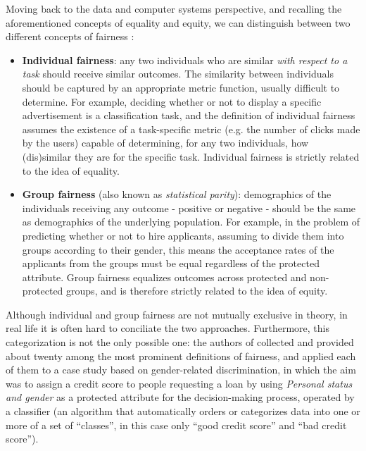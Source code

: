 Moving back to the data and computer systems perspective, and recalling the aforementioned concepts of equality and equity, we can distinguish between two different concepts of fairness \cite{dwork2012fairness}:
\begin{itemize}
\item \textbf{Individual fairness}: any two individuals who are similar \textit{with respect to a task} should receive similar outcomes. The similarity between individuals should be captured by an appropriate metric function, usually difficult to determine. For example, deciding whether or not to display a specific advertisement is a classification task, and the definition of individual fairness assumes the existence of a task-specific metric (e.g. the number of clicks made by the users) capable of determining, for any two individuals, how (dis)similar they are for the specific task. Individual fairness is strictly related to the idea of equality.
\item \textbf{Group fairness} (also known as \textit{statistical parity}): demographics of the individuals receiving any outcome - positive or negative - should be the same as demographics of the underlying population. For example, in the problem of predicting whether or not to hire applicants, assuming to divide them into groups according to their gender, this means the acceptance rates of the applicants from the groups must be equal regardless of the protected attribute. Group fairness equalizes outcomes across protected and non-protected groups, and is therefore strictly related to the idea of equity.
\end{itemize}

Although individual and group fairness are not mutually exclusive in theory, in real life it is often hard to conciliate the two approaches. Furthermore, this categorization is not the only possible one: the authors of \cite{verma2018fairness} collected and provided about twenty among the most prominent definitions of fairness, and applied each of them to a case study based on gender-related discrimination, in which the aim was to assign a credit score to people requesting a loan by using \textit{Personal status and gender} as a protected attribute for the decision-making process, operated by a classifier (an algorithm that automatically orders or categorizes data into one or more of a set of ``classes'', in this case only ``good credit score'' and ``bad credit score'').

